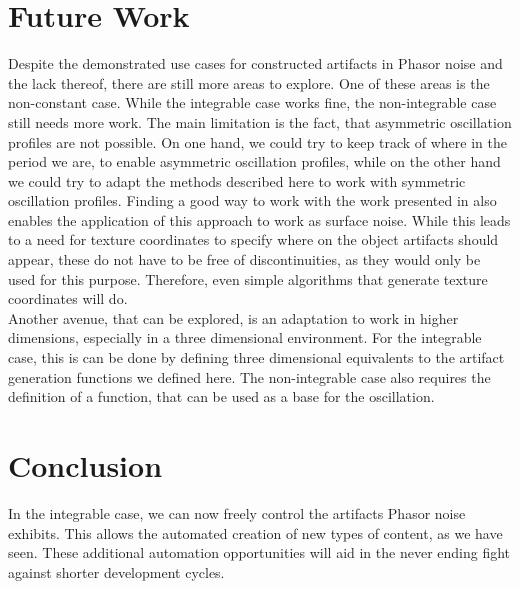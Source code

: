 \documentclass{utue} %
\begin{document}
\section{Future Work}
Despite the demonstrated use cases for constructed artifacts in Phasor noise and the lack thereof, there are still more areas to explore. One of these areas is the non-constant case. While the integrable case works fine, the non-integrable case still needs more work. The main limitation is the fact, that asymmetric oscillation profiles are not possible. On one hand, we could try to keep track of where in the period we are, to enable asymmetric oscillation profiles, while on the other hand we could try to adapt the methods described here to work with symmetric oscillation profiles. Finding a good way to work with the work presented in \cite{stripes} also enables the application of this approach to work as surface noise. While this leads to a need for texture coordinates to specify where on the object artifacts should appear, these do not have to be free of discontinuities, as they would only be used for this purpose. Therefore, even simple algorithms that generate texture coordinates will do.\\
Another avenue, that can be explored, is an adaptation to work in higher dimensions, especially in a three dimensional environment. For the integrable case, this is can be done by defining three dimensional equivalents to the artifact generation functions we defined here. The non-integrable case also requires the definition of a function, that can be used as a base for the oscillation.

\section{Conclusion}
In the integrable case, we can now freely control the artifacts Phasor noise exhibits. This allows the automated creation of new types of content, as we have seen. These additional automation opportunities will aid in the never ending fight against shorter development cycles.


\FloatBarrier
\printbibliography
\end{document}
